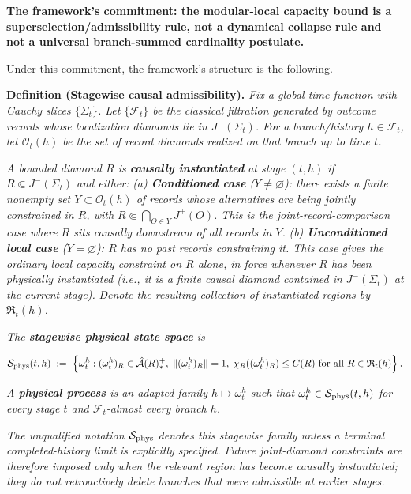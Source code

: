 \documentclass[11pt,a4paper]{article}
\begin{document}
\textbf{The framework's commitment: the modular-local capacity bound is a superselection/admissibility rule, not a dynamical collapse rule and not a universal branch-summed cardinality postulate.}

Under this commitment, the framework's structure is the following.

\textbf{Definition (Stagewise causal admissibility).} \emph{Fix a global time function with Cauchy slices $\{\Sigma_t\}$. Let $\{\mathcal{F}_t\}$ be the classical filtration generated by outcome records whose localization diamonds lie in $J^-(\Sigma_t)$. For a branch/history $h \in \mathcal{F}_t$, let $\mathcal{O}_t(h)$ be the set of record diamonds realized on that branch up to time $t$.}

\emph{A bounded diamond $R$ is \textbf{causally instantiated} at stage $(t, h)$ if $R \Subset J^-(\Sigma_t)$ and either:}
\emph{(a) \textbf{Conditioned case} ($Y \ne \varnothing$): there exists a finite nonempty set $Y \subset \mathcal{O}_t(h)$ of records whose alternatives are being jointly constrained in $R$, with $R \Subset \bigcap_{O \in Y} J^+(O)$. This is the joint-record-comparison case where $R$ sits causally downstream of all records in $Y$.}
\emph{(b) \textbf{Unconditioned local case} ($Y = \varnothing$): $R$ has no past records constraining it. This case gives the ordinary local capacity constraint on $R$ alone, in force whenever $R$ has been physically instantiated (i.e., it is a finite causal diamond contained in $J^-(\Sigma_t)$ at the current stage).}
\emph{Denote the resulting collection of instantiated regions by $\mathfrak{R}_t(h)$.}

\emph{The \textbf{stagewise physical state space} is}

\[
\mathcal{S}_{\rm phys}(t, h) \;:=\; \left\{ \omega_t^h : (\omega_t^h)_R \in \hat{\mathcal{A}}(R)_*^+,\; \|(\omega_t^h)_R\| = 1,\; \chi_R((\omega_t^h)_R) \le C(R) \text{ for all } R \in \mathfrak{R}_t(h) \right\}.
\]

\emph{A \textbf{physical process} is an adapted family $h \mapsto \omega_t^h$ such that $\omega_t^h \in \mathcal{S}_{\rm phys}(t, h)$ for every stage $t$ and $\mathcal{F}_t$-almost every branch $h$.}

\emph{The unqualified notation $\mathcal{S}_{\rm phys}$ denotes this stagewise family unless a terminal completed-history limit is explicitly specified. Future joint-diamond constraints are therefore imposed only when the relevant region has become causally instantiated; they do not retroactively delete branches that were admissible at earlier stages.}
\end{document}
